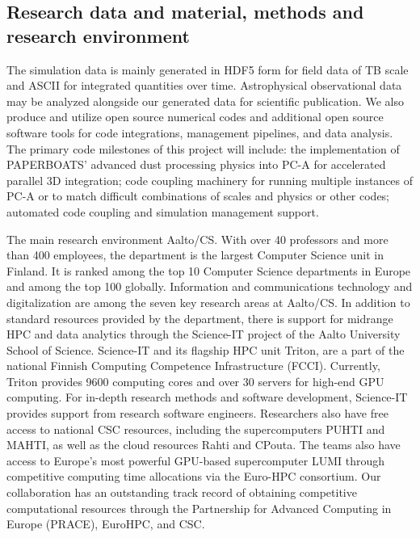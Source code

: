 \documentclass[a4paper,12pt]{article}
\begin{document}
\subsection{Research data and material, methods and research environment}

The simulation data is mainly generated in HDF5 form for field data of TB scale
and ASCII for integrated quantities over time.  Astrophysical observational
data may be analyzed alongside our generated data for scientific publication.
We also produce and utilize open source numerical codes and additional open
source software tools for code integrations, management pipelines, and data
analysis. The primary code milestones of this project will include: the
implementation of \textsc{PAPERBOATS}' advanced dust processing physics into
PC-A for accelerated parallel 3D integration; code coupling machinery for
running multiple instances of PC-A or to match difficult combinations of scales
and physics or other codes; automated code coupling and simulation management support.

The main research environment Aalto/CS. With over 40 professors
and more than 400 employees, the department is the largest Computer Science
unit in Finland. It is ranked among the top 10 Computer Science departments in
Europe and among the top 100 globally.  Information and communications
technology and digitalization are among the seven key research areas at
Aalto/CS. In addition to standard resources provided by the department, there
is support for midrange HPC and data analytics through the Science-IT project
of the Aalto University School of Science. Science-IT and its ﬂagship HPC unit
Triton, are a part of the national Finnish Computing Competence Infrastructure
(FCCI). Currently, Triton provides 9600 computing cores and over 30 servers for
high-end GPU computing. For in-depth research methods and software development,
Science-IT provides support from research software engineers.  Researchers also
have free access to national CSC resources, including the supercomputers PUHTI
and MAHTI, as well as the cloud resources Rahti and CPouta. The teams also have
access to Europe’s most powerful GPU-based supercomputer LUMI through
competitive computing time allocations via the Euro-HPC consortium.  Our
collaboration has an outstanding track record of obtaining competitive
computational resources through the Partnership for Advanced Computing in
Europe (PRACE), EuroHPC, and CSC.
\end{document}
